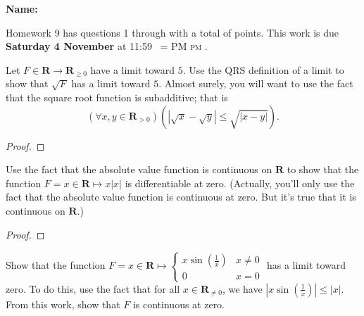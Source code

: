 \documentclass[12pt,fleqn,answers]{exam}
\makeatletter
\newcommand{\reals}{\mathbf{R}}
\newcommand{\quiz}{9}
\newcommand{\term}{Fall}
\DeclareRobustCommand{\maybefakesc}[1]{%
  \ifnum\pdfstrcmp{\f@series}{\bfdefault}=\z@
    {\fontsize{\dimexpr0.8\dimexpr\f@size pt\relax}{0}\selectfont\uppercase{#1}}%
  \else
    \textsc{#1}%
  \fi
}
\newcommand\PM{\,\maybefakesc{pm}\xspace}
\makeatother
\begin{document}
\large
\vspace{0.1in}
\noindent{}
{\bf Name:}  \\
\noindent \makebox[3.0truein][l]{\textbf{Homework \quiz, \term \/ \the\year}}
\vspace{0.1in}

\noindent  Homework \quiz\/  has questions 1 through  \numquestions \/ with a total 
of  \numpoints\/  points. 
This work is due \textbf{Saturday 4 November} at 11:59 \PM.

\vspace{0.1in}


\begin{questions}

 \question [10] Let $F \in \reals \to \reals_{\geq 0}$ have a limit  toward $5$. Use the QRS definition of a limit to 
 show that $\sqrt{F}$ has a limit toward $5$.  Almost surely, you will want to use the fact that the 
 square root function is subadditive; that is
 \begin{equation*}
 \left(\forall x, y \in \reals_{>0} \right)(|\sqrt{x} - \sqrt{y}| \leq \sqrt{|x - y|}).
 \end{equation*}
 \begin{solution}

\begin{proof}

\end{proof}
\end{solution}
 
\question [10] Use the fact that the absolute value function is continuous
on $\reals$ to show that the function $F = x \in \reals \mapsto x |x|$ 
is differentiable at zero.   (Actually, you'll only use the fact that the absolute value function is continuous
at zero. But it's true that it is continuous on $\reals$.)

\begin{solution}

\begin{proof}

\end{proof}
\end{solution}

\question [10] Show that the function $F = x \in \reals \mapsto \begin{cases}
    x \sin(\frac{1}{x}) & x \neq 0 \\
    0 & x = 0
\end{cases}$ has a limit toward zero.  To do this, use the 
fact that for all $x \in \reals_{\neq 0}$, we have $|x \sin(\frac{1}{x})| \leq |x|$.
From this work, show that $F$ is continuous at zero.
\begin{solution}


\end{solution}
\end{questions}
\end{document}
